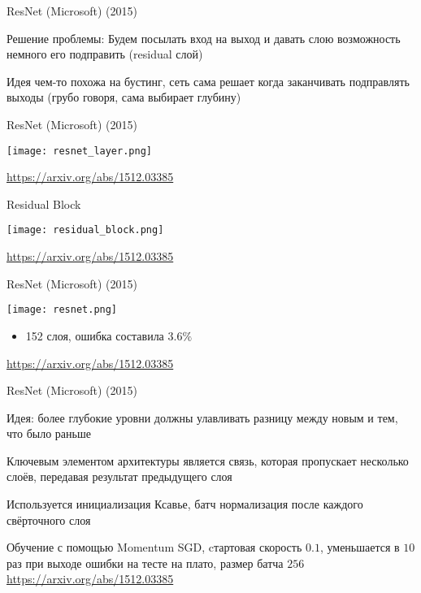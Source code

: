 \documentclass[notes,12pt, aspectratio=169]{beamer}
\newenvironment{wideitemize}{\itemize\addtolength{\itemsep}{10pt}}{\enditemize}
\begin{document}
\begin{frame}{ResNet (Microsoft) (2015)}
\begin{wideitemize}
	\item \alert{Решение проблемы:} Будем посылать вход на выход и давать слою возможность немного его подправить (residual слой)
	\item Идея чем-то похожа на бустинг, сеть сама решает когда заканчивать подправлять выходы (грубо говоря, сама выбирает глубину)
\end{wideitemize}
\end{frame}


\begin{frame}{ResNet (Microsoft) (2015)}
\begin{center}
	\texttt{[image: resnet\_layer.png]}
\end{center}
\vfill %
\footnotesize
\color{blue} \url{https://arxiv.org/abs/1512.03385}
\end{frame}


\begin{frame}{Residual Block }
	\begin{center}
		\texttt{[image: residual\_block.png]}
	\end{center}
	\vfill %
	\footnotesize
	\color{blue} \url{https://arxiv.org/abs/1512.03385}
\end{frame}


\begin{frame}{ResNet (Microsoft) (2015)}
\begin{center}
	\texttt{[image: resnet.png]}
\end{center}
\begin{itemize}
	\item 152 слоя, ошибка составила $3.6\%$
\end{itemize}
\vfill %
\footnotesize
\color{blue} \url{https://arxiv.org/abs/1512.03385}
\end{frame}


\begin{frame}{ResNet (Microsoft) (2015)}
\begin{wideitemize}
	\item \alert{Идея:} более глубокие уровни должны улавливать разницу между новым и тем, что было раньше 
	
	\item Ключевым элементом архитектуры является связь, которая пропускает несколько слоёв, передавая результат предыдущего слоя
	
	\item Используется инициализация Ксавье, батч нормализация после каждого свёрточного слоя
	
	\item Обучение с помощью Momentum SGD, cтартовая скорость $0.1$, уменьшается в $10$ раз при выходе ошибки на тесте на плато, размер батча $256$
\end{wideitemize}
\vfill %
\footnotesize
\color{blue} \url{https://arxiv.org/abs/1512.03385}
\end{frame}
\end{document}
